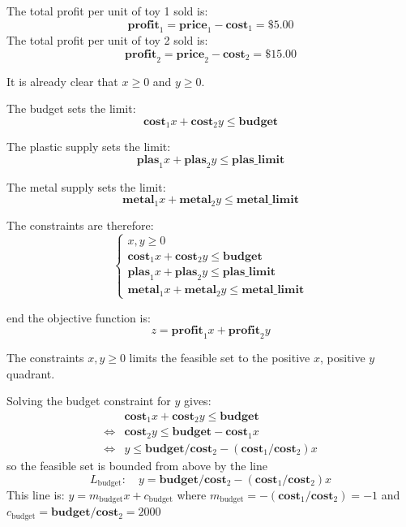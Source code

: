 \documentclass{article}
\begin{document}
\vspace{5mm}

The total profit per unit of toy 1 sold is:
\[\textbf{profit}_1 = \textbf{price}_1 - \textbf{cost}_1 = \$5.00\]
The total profit per unit of toy 2 sold is:
\[\textbf{profit}_2 = \textbf{price}_2 - \textbf{cost}_2 = \$15.00\]

\vspace{5mm}

It is already clear that \(x \geq 0\) and \(y \geq 0\). 

\vspace{5mm}

The budget sets the limit:
\[\textbf{cost}_1 x + \textbf{cost}_2 y \leq \textbf{budget}\] 

\vspace{5mm}

The plastic supply sets the limit:
\[\textbf{plas}_1 x + \textbf{plas}_2 y \leq \textbf{plas\_limit}\]

\vspace{5mm}

The metal supply sets the limit:
\[\textbf{metal}_1 x + \textbf{metal}_2 y \leq \textbf{metal\_limit}\]

\vspace{5mm}

The constraints are therefore:
\[\left\{\begin{array}{c}
x, y \geq 0 \\
\textbf{cost}_1 x + \textbf{cost}_2 y \leq \textbf{budget} \\
\textbf{plas}_1 x + \textbf{plas}_2 y \leq \textbf{plas\_limit} \\
\textbf{metal}_1 x + \textbf{metal}_2 y \leq \textbf{metal\_limit}
\end{array}\right.\] 

end the objective function is:
\[z = \textbf{profit}_1x + \textbf{profit}_2y\]

\vspace{5mm}

The constraints \(x, y \geq 0\) limits the feasible set to the positive \(x\), positive \(y\) quadrant. 

\vspace{5mm}

Solving the budget constraint for \(y\) gives:
\begin{align*}
& \textbf{cost}_1 x + \textbf{cost}_2 y \leq \textbf{budget} \\ 
\iff & \textbf{cost}_2 y \leq \textbf{budget} - \textbf{cost}_1 x \\
\iff & y \leq \textbf{budget}/\textbf{cost}_2 - (\textbf{cost}_1/\textbf{cost}_2)x
\end{align*}
so the feasible set is bounded from above by the line 
\[L_\text{budget} : \quad y = \textbf{budget}/\textbf{cost}_2 - (\textbf{cost}_1/\textbf{cost}_2)x\]
This line is: \(y = m_\text{budget}x + c_\text{budget}\) where \(m_\text{budget} =  -(\textbf{cost}_1/\textbf{cost}_2) = -1\) and \(c_\text{budget} = \textbf{budget}/\textbf{cost}_2 = 2000\)
\end{document}
